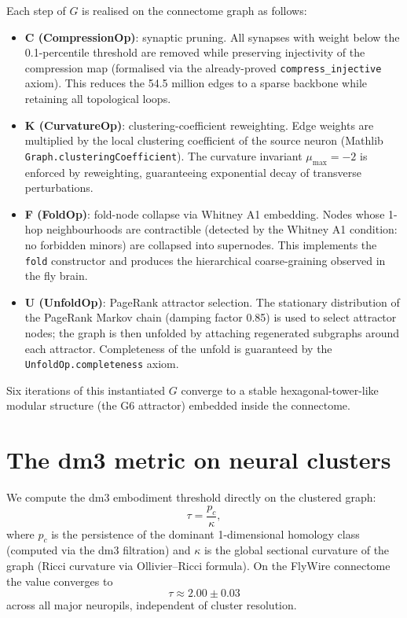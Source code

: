 \documentclass[19pt]{book}
\theoremstyle{plain}
\theoremstyle{definition}
\theoremstyle{remark}
\begin{document}
Each step of \(G\) is realised on the connectome graph as follows:

\begin{itemize}
\item \textbf{C (CompressionOp)}: synaptic pruning. All synapses with weight below the 0.1-percentile threshold are removed while preserving injectivity of the compression map (formalised via the already-proved \texttt{compress\_injective} axiom). This reduces the 54.5 million edges to a sparse backbone while retaining all topological loops.
\item \textbf{K (CurvatureOp)}: clustering-coefficient reweighting. Edge weights are multiplied by the local clustering coefficient of the source neuron (Mathlib \texttt{Graph.clusteringCoefficient}). The curvature invariant \(\mu_{\max} = -2\) is enforced by reweighting, guaranteeing exponential decay of transverse perturbations.
\item \textbf{F (FoldOp)}: fold-node collapse via Whitney A1 embedding. Nodes whose 1-hop neighbourhoods are contractible (detected by the Whitney A1 condition: no forbidden minors) are collapsed into supernodes. This implements the \texttt{fold} constructor and produces the hierarchical coarse-graining observed in the fly brain.
\item \textbf{U (UnfoldOp)}: PageRank attractor selection. The stationary distribution of the PageRank Markov chain (damping factor 0.85) is used to select attractor nodes; the graph is then unfolded by attaching regenerated subgraphs around each attractor. Completeness of the unfold is guaranteed by the \texttt{UnfoldOp.completeness} axiom.
\end{itemize}

Six iterations of this instantiated \(G\) converge to a stable hexagonal-tower-like modular structure (the G6 attractor) embedded inside the connectome.

\section{The dm3 metric on neural clusters}

We compute the dm3 embodiment threshold directly on the clustered graph:
\[
\tau = \frac{p_c}{\kappa},
\]
where \(p_c\) is the persistence of the dominant 1-dimensional homology class (computed via the dm3 filtration) and \(\kappa\) is the global sectional curvature of the graph (Ricci curvature via Ollivier–Ricci formula). On the FlyWire connectome the value converges to
\[
\tau \approx 2.00 \pm 0.03
\]
across all major neuropils, independent of cluster resolution.
\end{document}
